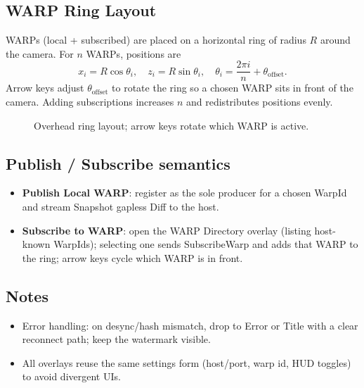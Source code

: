 \subsection{WARP Ring Layout}
WARPs (local + subscribed) are placed on a horizontal ring of radius $R$ around the camera. For $n$ WARPs, positions are
\[
  x_i = R\cos \theta_i, \quad z_i = R\sin \theta_i, \quad \theta_i = \frac{2\pi i}{n} + \theta_\text{offset}.
\]
Arrow keys adjust $\theta_\text{offset}$ to rotate the ring so a chosen WARP sits in front of the camera. Adding subscriptions increases $n$ and redistributes positions evenly.

\begin{figure}[htbp]
  \centering
{}
  \caption{Overhead ring layout; arrow keys rotate which WARP is active.}
\end{figure}

\subsection{Publish / Subscribe semantics}
\begin{itemize}
  \item \textbf{Publish Local WARP}: register as the sole producer for a chosen WarpId and stream Snapshot \textrightarrow{} gapless Diff to the host.
  \item \textbf{Subscribe to WARP}: open the WARP Directory overlay (listing host-known WarpIds); selecting one sends SubscribeWarp and adds that WARP to the ring; arrow keys cycle which WARP is in front.
\end{itemize}

\subsection{Notes}
\begin{itemize}
  \item Error handling: on desync/hash mismatch, drop to Error or Title with a clear reconnect path; keep the watermark visible.
  \item All overlays reuse the same settings form (host/port, warp id, HUD toggles) to avoid divergent UIs.
\end{itemize}
